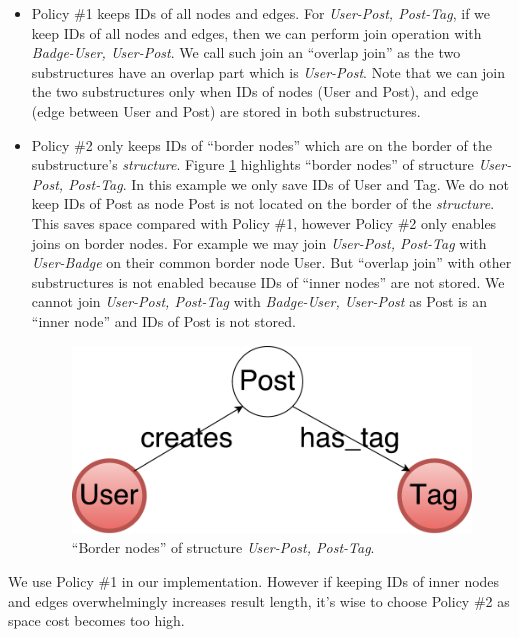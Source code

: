 \begin{itemize}
\item Policy \#1 keeps IDs of all nodes and edges. For \textit{User-Post, Post-Tag}, if we keep IDs of all nodes and edges, then we can perform join operation with \textit{Badge-User, User-Post}. We call such join an ``overlap join'' as the two substructures have an overlap part which is \textit{User-Post}. Note that we can join the two substructures only when IDs of nodes (User and Post), and edge (edge between User and Post) are stored in both substructures.

\item Policy \#2 only keeps IDs of ``border nodes'' which are on the border of the substructure's \textit{structure}. Figure \ref{border node} highlights ``border nodes'' of structure \textit{User-Post, Post-Tag}. In this example we only save IDs of User and Tag. We do not keep IDs of Post as node Post is not located on the border of the \textit{structure}. This saves space compared with Policy \#1, however Policy \#2 only enables joins on border nodes. For example we may join \textit{User-Post, Post-Tag} with \textit{User-Badge} on their common border node User. But ``overlap join'' with other substructures is not enabled because IDs of ``inner nodes'' are not stored. We cannot join \textit{User-Post, Post-Tag} with \textit{Badge-User, User-Post} as Post is an ``inner node'' and IDs of Post is not stored. 

\begin{figure}[h]
	\centering
	\includegraphics[scale=0.35]{pic/bordernode.pdf}
	\caption{``Border nodes'' of structure \textit{User-Post, Post-Tag}.}
	\label{border node}
\end{figure}
\end{itemize}


We use Policy \#1 in our implementation. However if keeping IDs of inner nodes and edges overwhelmingly increases result length, it's wise to choose Policy \#2 as space cost becomes too high.

